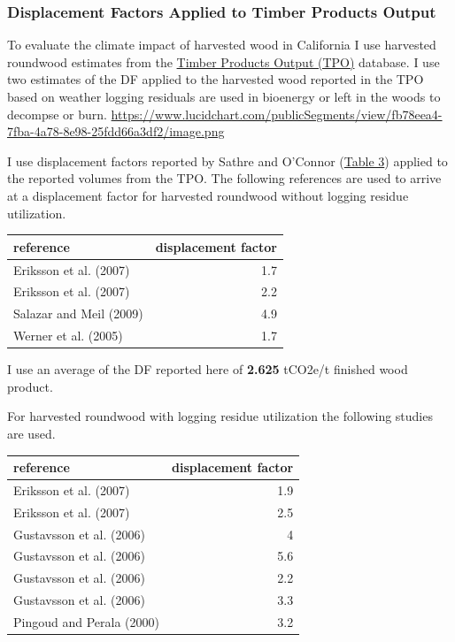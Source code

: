 \documentclass[a4paper]{article}
\begin{document}
\subsubsection{Displacement Factors Applied to Timber Products Output}
\label{sec:orgheadline6}

To evaluate the climate impact of harvested wood in California I use
harvested roundwood estimates from the
\href{http://srsfia2.fs.fed.us/php/tpo_2009/tpo_rpa_int1.php}{Timber
Products Output (TPO)} database. I use two estimates of the DF applied
to the harvested wood reported in the TPO based on weather logging
residuals are used in bioenergy or left in the woods to decompse or
burn.
\url{https://www.lucidchart.com/publicSegments/view/fb78eea4-7fba-4a78-8e98-25fdd66a3df2/image.png}

I use displacement factors reported by Sathre and O'Connor
(\href{https://docs.google.com/spreadsheets/d/13UQtRfNBSJ81PXxbYSnB2LrjHePNcvhJhrsxRBjHpoY/pubhtml?gid=546564075&single=true}{Table
3}) applied to the reported volumes from the TPO. The following
references are used to arrive at a displacement factor for harvested
roundwood without logging residue utilization.

\begin{center}
\begin{tabular}{lr}
reference & displacement factor\\
\hline
Eriksson et al. (2007) & 1.7\\
Eriksson et al. (2007) & 2.2\\
Salazar and Meil (2009) & 4.9\\
Werner et al. (2005) & 1.7\\
\end{tabular}

\end{center}

I use an average of the DF reported here of \textbf{2.625} tCO2e/t finished
wood product.

For harvested roundwood with logging residue utilization the following
studies are used.

\begin{center}
\begin{tabular}{lr}
reference & displacement factor\\
\hline
Eriksson et al. (2007) & 1.9\\
Eriksson et al. (2007) & 2.5\\
Gustavsson et al. (2006) & 4\\
Gustavsson et al. (2006) & 5.6\\
Gustavsson et al. (2006) & 2.2\\
Gustavsson et al. (2006) & 3.3\\
Pingoud and Perala (2000) & 3.2\\
\end{tabular}

\end{center}
\end{document}
